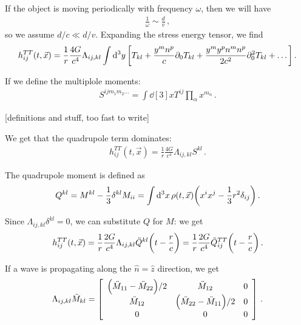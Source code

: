 \documentclass[main.tex]{subfiles}
\begin{document}
If the object is moving periodically with frequency \(\omega \), then we will have 
%
\begin{align}
\frac{1}{\omega } \sim \frac{d}{v}
\,,
\end{align}
%
so we assume \(d/c \ll d/v\). Expanding the stress energy tensor, we find 
%
\begin{align}
h_{ij}^{TT} (t, \vec{x}) = \frac{1}{r} \frac{4G}{c^{4}} \Lambda_{ij, kl} \int \dd[3]{y}\qty[T_{kl} + \frac{y^{m} n^{p}}{c} \partial_0 T_{kl}  + \frac{y^{m} y^{p} n^{m} n^{p}}{2c^2} \partial_0^2 T_{kl} + \dots]
\,.
\end{align}

If we define the multiplole moments: 
%
\begin{align}
S^{ij m_1 m_2 \dots} = \int \dd[3]{x} T^{ij} \prod_\alpha  x^{m_\alpha }
\,.
\end{align}

[definitions and stuff, too fast to write]

We get that the quadrupole term dominates: 
%
\begin{align}
h_{ij}^{TT} (t, \vec{x}) = \frac{1}{r} \frac{4G}{c^{4}}
\Lambda_{ij, kl} S^{kl}
\,.
\end{align}

The quadrupole moment is defined as 
%
\begin{align}
Q^{kl} = M^{kl} - \frac{1}{3} \delta^{kl} M_{ii} 
= \int \dd[3]{x} \rho (t, \vec{x}) \qty(x^{i} x^{j} - \frac{1}{3} r^2 \delta_{ij})
\,.
\end{align}

Since \(\Lambda_{ij, kl} \delta^{kl} =0 \), we can substitute \(Q\) for \(M\): we get 
%
\begin{align}
h_{ij}^{TT} (t, \vec{x}) = \frac{1}{r} \frac{2G}{c^{4}}
\Lambda_{ij, kl} \ddot{Q}^{kl} \qty(t - \frac{r}{c})
= \frac{1}{r} \frac{2G}{c^{4}} \ddot{Q}^{TT}_{ij} \qty(t - \frac{r}{c})
\,.
\end{align}

If a wave is propagating along the \(\hat{n} = \hat{z}\) direction, we get 
%
\begin{align}
\Lambda_{ij, kl} \ddot{M}_{kl} = \left[\begin{array}{ccc}
\qty(\ddot{M}_{11} - \ddot{M}_{22}) / 2 &  \ddot{M}_{12} & 0 \\ 
\ddot{M}_{12} & \qty(\ddot{M}_{22} - \ddot{M}_{11}) / 2 & 0 \\ 
0 & 0 & 0
\end{array}\right]
\,.
\end{align}
\end{document}
